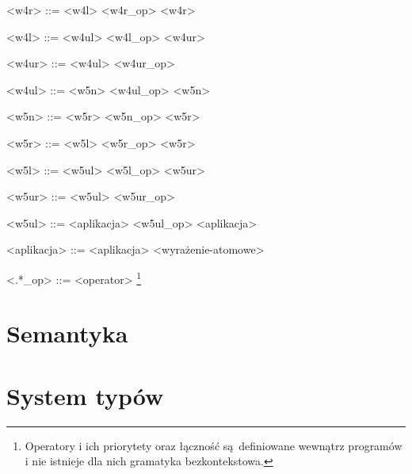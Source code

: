 \documentclass[12pt]{article}
\begin{document}
\begin{grammar}
<w4r> ::=
    <w4l>
     <w4r_op> <w4r>

<w4l> ::=
    <w4ul>
     <w4l_op> <w4ur>

<w4ur> ::=
    <w4ul>
     <w4ur_op> 
    
<w4ul> ::=
    <w5n>
    \alt <w4ul_op> <w5n>

<w5n> ::=
    <w5r>
     <w5n_op> <w5r>

<w5r> ::=
    <w5l>
     <w5r_op> <w5r>

<w5l> ::=
    <w5ul>
     <w5l_op> <w5ur>

<w5ur> ::=
    <w5ul>
     <w5ur_op>
    
<w5ul> ::=
    <aplikacja>
    \alt <w5ul_op> <aplikacja>

<aplikacja> ::=
    <aplikacja> <wyrażenie-atomowe>

<.*_op> ::= 
    <operator>
    \footnote{
        Operatory i ich priorytety oraz 
        łączność są definiowane wewnątrz programów
        i nie istnieje dla nich gramatyka bezkontekstowa.
    }



\end{grammar}

\section{Semantyka}

\section{System typów}
\end{document}
